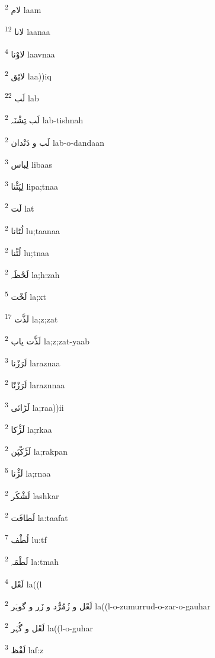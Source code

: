 \documentclass[12pt]{article}
\begin{document}
\begin{RTL}
\begin{multicols}{5}
{\ur لام}   \textsuperscript{2} laam

{\ur لانا}   \textsuperscript{12} laanaa

{\ur لاوْنا}   \textsuperscript{4} laavnaa

{\ur لائِق}   \textsuperscript{2} laa))iq

{\ur لَب}   \textsuperscript{22} lab

{\ur لَب تِشْنَہ}   \textsuperscript{2} lab-tishnah

{\ur لَب و دَنْدان}   \textsuperscript{2} lab-o-dandaan

{\ur لِباس}   \textsuperscript{3} libaas

{\ur لِپَٹْنا}   \textsuperscript{3} lipa;tnaa

{\ur لَت}   \textsuperscript{2} lat

{\ur لُٹانا}   \textsuperscript{2} lu;taanaa

{\ur لُٹْنا}   \textsuperscript{2} lu;tnaa

{\ur لَحْظَہ}   \textsuperscript{2} la;h:zah

{\ur لَخْت}   \textsuperscript{5} la;xt

{\ur لَذَّت}   \textsuperscript{17} la;z;zat

{\ur لَذَّت یاب}   \textsuperscript{2} la;z;zat-yaab

{\ur لَرَزْنا}   \textsuperscript{3} laraznaa

{\ur لَرَزْنّا}   \textsuperscript{2} laraznnaa

{\ur لَڑائی}   \textsuperscript{3} la;raa))ii

{\ur لَڑْکا}   \textsuperscript{2} la;rkaa

{\ur لَڑَکْپَن}   \textsuperscript{2} la;rakpan

{\ur لَڑْنا}   \textsuperscript{5} la;rnaa

{\ur لَشْکَر}   \textsuperscript{2} lashkar

{\ur لَطافَت}   \textsuperscript{2} la:taafat

{\ur لُطْف}   \textsuperscript{7} lu:tf

{\ur لَطْمَہ}   \textsuperscript{2} la:tmah

{\ur لَعْل}   \textsuperscript{4} la((l

{\ur لَعْل و زُمُرُّد و زَر و گوہَر}   \textsuperscript{2} la((l-o-zumurrud-o-zar-o-gauhar

{\ur لَعْل و گُہَر}   \textsuperscript{2} la((l-o-guhar

{\ur لَفْظ}   \textsuperscript{3} laf:z


\end{multicols}
\end{RTL}
\end{document}
